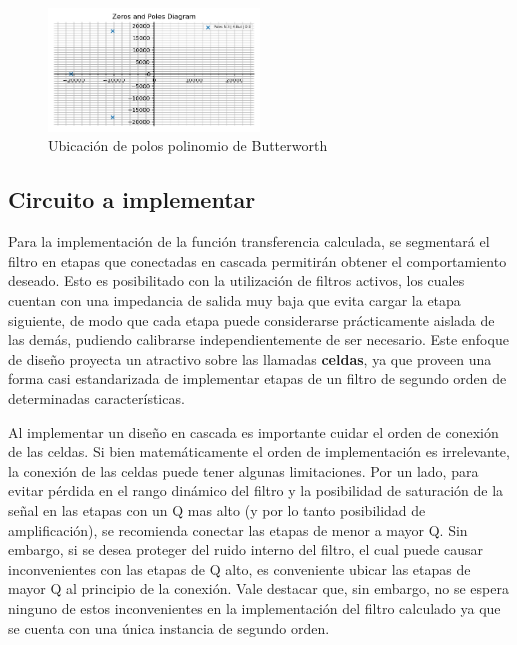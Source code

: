 \begin{figure}[H]
    \centering
    \includegraphics[width= 0.5\textwidth]{../Ejercicio2-DisenoDeCeldas/1CeldaSallenKey/images/PolesButter.png}
    \caption{Ubicación de polos polinomio de Butterworth}
    \label{fig:Plantilla}
\end{figure}

\subsection{Circuito a implementar}

Para la implementación de la función transferencia calculada, se segmentará el filtro en etapas que conectadas en cascada permitirán obtener el comportamiento deseado. Esto es posibilitado con la utilización de filtros activos, los cuales cuentan con una impedancia de salida muy baja que evita cargar la etapa siguiente, de modo que cada etapa puede considerarse prácticamente aislada de las demás, pudiendo calibrarse independientemente de ser necesario. Este enfoque de diseño proyecta un atractivo sobre las llamadas \textbf{celdas}, ya que proveen una forma casi estandarizada de implementar etapas de un filtro de segundo orden de determinadas características. 

Al implementar un diseño en cascada es importante cuidar el orden de conexión de las celdas. Si bien matemáticamente el orden de implementación es irrelevante, la conexión de las celdas puede tener algunas limitaciones. Por un lado, para evitar pérdida en el rango dinámico del filtro y la posibilidad de saturación de la señal en las etapas con un Q mas alto (y por lo tanto posibilidad de amplificación), se recomienda conectar las etapas de menor a mayor Q. Sin embargo, si se desea proteger del ruido interno del filtro, el cual puede causar inconvenientes con las etapas de Q alto, es conveniente ubicar las etapas de mayor Q al principio de la conexión. Vale destacar que, sin embargo, no se espera ninguno de estos inconvenientes en la implementación del filtro calculado ya que se cuenta con una única instancia de segundo orden.

